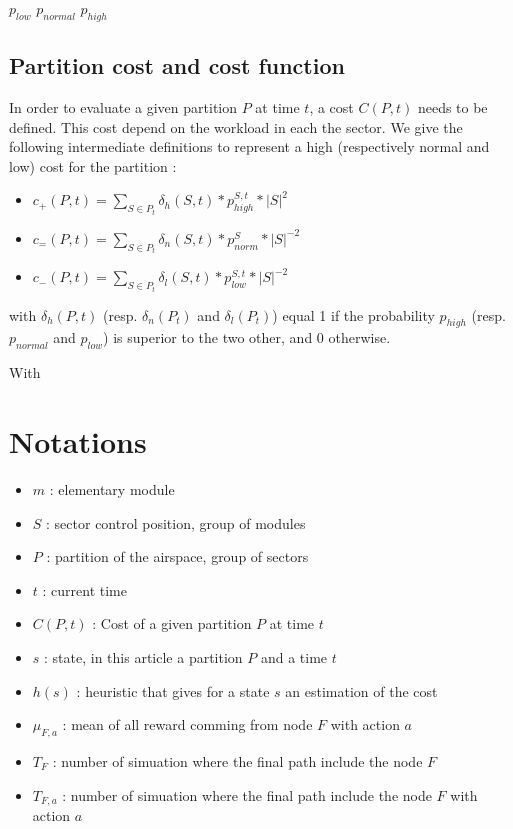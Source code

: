 \documentclass[twoside,twocolumn]{article}
\begin{document}
$p_{low}$
$p_{normal}$
$p_{high}$

\subsection{Partition cost and cost function}

In order to evaluate a given partition $P$ at time $t$, a cost $C(P, t)$ needs
to be defined. This cost depend on the workload in each the sector. We give the
following intermediate definitions to represent a high (respectively normal
and low) cost for the partition :
\begin{itemize}
    \item $c_+(P, t) = \sum_{S \in P_t} \delta_{h}(S, t) * p_{high}^{S, t} * |S|^2$
    \item $c_=(P, t) = \sum_{S \in P_t} \delta_{n}(S, t) * p_{norm}^{S} * |S|^{-2}$
    \item $c_-(P, t) = \sum_{S \in P_t} \delta_{l}(S, t) * p_{low}^{S, t} * |S|^{-2}$
\end{itemize}
with $\delta_{h}(P, t)$ (resp. $\delta_{n}(P_t)$ and $\delta_{l}(P_t)$) equal 1
if the probability $p_{high}$ (resp. $p_{normal}$ and $p_{low}$) is superior to
the two other, and 0 otherwise.

With

\section*{Notations}

\begin{itemize}
    \item $m$ : elementary module
    \item $S$ : sector control position, group of modules
    \item $P$ : partition of the airspace, group of sectors
    \item $t$ : current time
    \item $C(P, t)$ : Cost of a given partition $P$ at time $t$
    \item $s$ : state, in this article a partition $P$ and a time $t$
    \item $h(s)$ : heuristic that gives for a state $s$ an estimation of the cost
    \item $\mu_{F, a}$ : mean of all reward comming from node $F$ with action $a$
    \item $T_F$ : number of simuation where the final path include the node $F$
    \item $T_{F, a}$ : number of simuation where the final path include the node $F$ with action $a$
\end{itemize}




\end{document}
